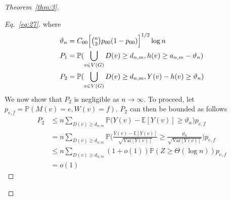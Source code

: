\documentclass[draftcls]{IEEEtran}
\theoremstyle{definition}
\begin{document}
\begin{proof}[Theorem~\ref{thm:3}]
\begin{proof}[Eq.~\eqref{eq:27}]
  where 
  \begin{align*}
    \vartheta_n &= C_{00} \Bigl[ \tbinom{n}{2} p_{00} (1 -
    p_{00})\Bigr]^{1/2} \log{n} \\
    P_1 &= \mathbb{P}(\bigcup_{v \in V(G)} D(v) \geq d_{n,m}, h(v) \geq
    a_{n,m} - \vartheta_n) \\
    P_2 &= \mathbb{P}(\bigcup_{v \in V(G)} D(v) \geq d_{n,m},
    Y(v) - h(v) \geq \vartheta_n)
  \end{align*}
  We now show that $P_2$ is negligible as $n \rightarrow \infty$. To
  proceed, let $p_{e,f} = \mathbb{P}(M(v) = e, W(v) =
f)$. $P_2$ can then be bounded as follows
\begin{equation*}
  \begin{split}
    P_2 & \leq n \sum_{D(v) \geq
        d_{n,m}}{\mathbb{P}\biggl( Y(v) - \mathbb{E}[Y(v)] \geq
        \vartheta_n \biggr) p_{e,f}}
  \\
  &= n \sum_{D(v) \geq d_{n,m}}{\mathbb{P}\biggl(
    \tfrac{Y(v) - \mathbb{E}[Y(v)]}{\sqrt{\mathrm{Var}[Y(v)]}} \geq
    \tfrac{\vartheta_n}{\sqrt{\mathrm{Var}[Y(v)]}} \biggr) p_{e,f}} \\
    &\leq n \sum_{D(v) \geq d_{n,m}} (1 + o(1)) \mathbb{P}(Z \geq \Theta(\log{n})) p_{e,f} \\
    &= o(1)
  \end{split}
\end{equation*}

\end{proof}
\end{proof}

\end{document}
